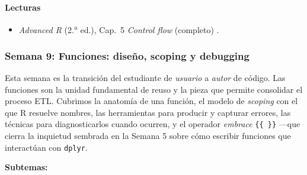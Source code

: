 \documentclass[11pt,letterpaper]{article}
\newcommand{\semana}[2]{%
  \subsubsection*{\color{main}Semana #1: #2}%
}
\begin{document}
\medskip
\noindent\textbf{Lecturas}
\begin{itemize}[leftmargin=*, itemsep=1pt]
    \item \textit{Advanced R} (2.\textsuperscript{a} ed.), Cap.\ 5 \textit{Control flow} (completo) \cite{wickham2019advr}.
\end{itemize}

\semana{9}{Funciones: diseño, scoping y debugging}

Esta semana es la transición del estudiante de \textit{usuario} a \textit{autor} de código. Las funciones son la unidad fundamental de reuso y la pieza que permite consolidar el proceso ETL. Cubrimos la anatomía de una función, el modelo de \textit{scoping} con el que R resuelve nombres, las herramientas para producir y capturar errores, las técnicas para diagnosticarlos cuando ocurren, y el operador \textit{embrace} \texttt{\{\{~\}\}} ---que cierra la inquietud sembrada en la Semana 5 sobre cómo escribir funciones que interactúan con \texttt{dplyr}.

\textbf{Subtemas:}
\end{document}
